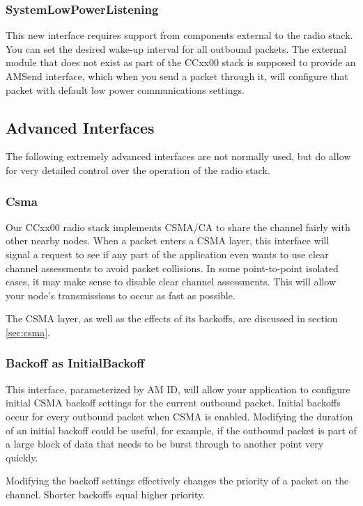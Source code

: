 \documentclass{article}
\begin{document}
\subsubsection{SystemLowPowerListening}
This new interface requires support from components external to the radio stack. You can 
set the desired wake-up interval for all outbound packets. The external module that does
not exist as part of the CCxx00 stack is supposed to provide an AMSend interface, which
when you send a packet through it, will configure that packet with default low power 
communications settings. 

\subsection{Advanced Interfaces}
\label{sec:advancedinterfaces}

The following extremely advanced interfaces are not normally used, but do allow for 
very detailed control over the operation of the radio stack.

\subsubsection{Csma}
Our CCxx00 radio stack implements CSMA/CA to share the channel fairly with other nearby
nodes. When a packet enters a CSMA layer, this interface will signal a request to see
if any part of the application even wants to use clear channel assessments to avoid packet collisions.
In some point-to-point isolated cases, it may make sense to disable clear channel assessments.
This will allow your node's transmissions to occur as fast as possible.

The CSMA layer, as well as the effects of its backoffs, are discussed in section \ref{sec:csma}.

\subsubsection{Backoff as InitialBackoff}
This interface, parameterized by AM ID, will allow your application to configure initial
CSMA backoff settings for the current outbound packet. Initial backoffs occur for every outbound
packet when CSMA is enabled. Modifying the duration of an initial backoff could be useful, for example,
if the outbound packet is part of a large block of data that needs to be burst through
to another point very quickly.  

Modifying the backoff settings effectively changes the priority of a packet on the channel.
Shorter backoffs equal higher priority.
\end{document}
